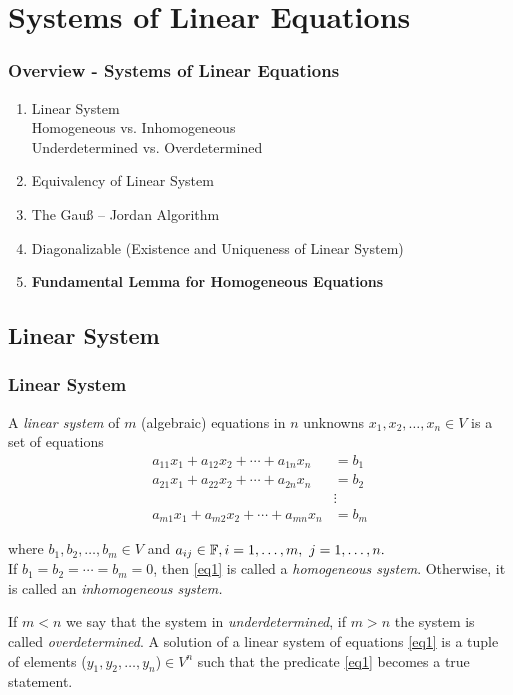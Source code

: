 \documentclass[12pt, t]{beamer}
\renewcommand{\emph}[1]{{\color{Turquoise3}\textsl{#1}}}
\newcommand{\myseries}[2]{$#1_1,#1_2,\dots,#1_#2$}
\begin{document}
\section{Systems of Linear Equations}
\begin{frame}
    \frametitle{Overview - Systems of Linear Equations}
    \begin{enumerate}
        \item Linear System
              \\ Homogeneous vs. Inhomogeneous
              \\ Underdetermined vs. Overdetermined
        \item Equivalency of Linear System
        \item The Gauß – Jordan Algorithm
        \item Diagonalizable (Existence and Uniqueness of Linear System)
        \item \textbf{Fundamental Lemma for Homogeneous Equations}
    \end{enumerate}
\end{frame}

\subsection{Linear System}
\begin{frame}
    \frametitle{Linear System}

    A \emph{linear system} of $m$ (algebraic) equations in $n$ unknowns \myseries{x}{n}$\in V$ is a set of equations
    \begin{equation}
        \begin{aligned}
            a_{11}x_1+a_{12}x_2+\cdots+a_{1n}x_n & =b_1   \\
            a_{21}x_1+a_{22}x_2+\cdots+a_{2n}x_n & =b_2   \\
                                                 & \vdots \\
            a_{m1}x_1+a_{m2}x_2+\cdots+a_{mn}x_n & =b_m
        \end{aligned}
        \label{eq1}
    \end{equation}

    where \myseries{b}{m}$\in V$ and $a_{ij}\in\mathbb{F},i=1,\ldots,m,~j=1,\ldots,n.$\\
    If $b_1=b_2=\cdots=b_m=0$, then \eqref{eq1} is called a \emph{homogeneous system}. Otherwise, it is called an \emph{inhomogeneous system.}

    If $m<n$ we say that the system in \emph{underdetermined}, if $m>n$ the system is called \emph{overdetermined}.
    A solution of a linear system of equations \eqref{eq1} is a tuple of elements (\myseries{y}{n})$\in V^n$ such that the predicate \eqref{eq1} becomes a true statement.\\[3pt]
\end{frame}
\end{document}

